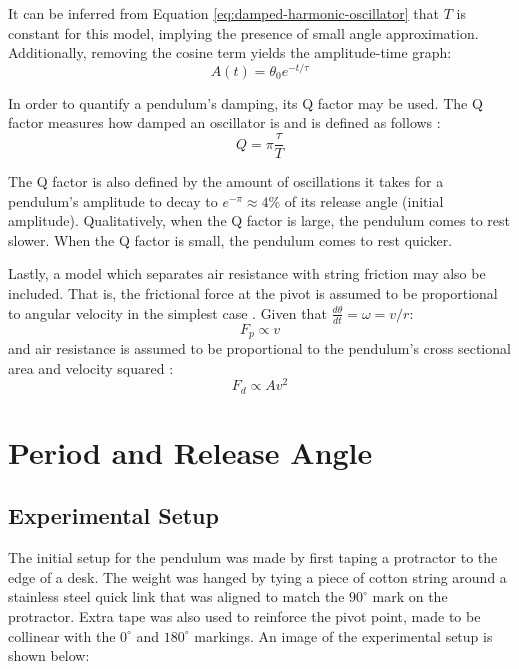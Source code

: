 \documentclass[11pt]{article}
\begin{document}
\begin{multicols}{2}
It can be inferred from Equation \ref{eq:damped-harmonic-oscillator} that $T$ is constant for this model, implying the presence of small angle approximation. Additionally, removing the cosine term yields the amplitude-time graph:
\begin{equation} \label{eq:amplitude-function}
    A(t) = \theta_0 e^{-{t/\tau}}
\end{equation}

In order to quantify a pendulum's damping, its Q factor may be used. The Q factor measures how damped an oscillator is and is defined as follows \cite{pnp-physics}:
\begin{equation} \label{eq:q-factor-formula}
    Q = \pi\frac{\tau}{T}
\end{equation}

The Q factor is also defined by the amount of oscillations it takes for a pendulum's amplitude to decay to $e^{-\pi} \approx 4\%$ of its release angle (initial amplitude). Qualitatively, when the Q factor is large, the pendulum comes to rest slower. When the Q factor is small, the pendulum comes to rest quicker.

Lastly, a model which separates air resistance with string friction may also be included. That is, the frictional force at the pivot is assumed to be proportional to angular velocity in the simplest case \cite{duke-pendulum}. Given that $\frac{d\theta}{dt} = \omega = v/r$:
\begin{equation} \label{eq:propto v}
    F_p \propto v
\end{equation}
and air resistance is assumed to be proportional to the pendulum's cross sectional area and velocity squared \cite{airdrag}:
\begin{equation} \label{eq:propto v2}
    F_d \propto Av^2
\end{equation}

\section{Period and Release Angle} \label{sec 3 period and release angle}

\subsection{Experimental Setup} \label{sec 3.1 experimental setup}
The initial setup for the pendulum was made by first taping a protractor to the edge of a desk. The weight was hanged by tying a piece of cotton string around a stainless steel quick link that was aligned to match the $90^{\circ}$ mark on the protractor. Extra tape was also used to reinforce the pivot point, made to be collinear with the $0^{\circ}$ and $180^{\circ}$ markings. An image of the experimental setup is shown below:


\end{multicols}
\end{document}
